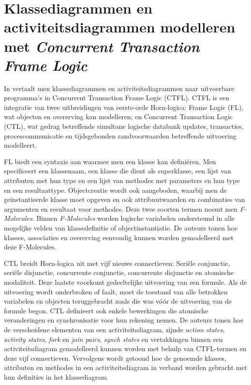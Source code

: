 \section{Klassediagrammen en activiteitsdiagrammen modelleren met \textit{Concurrent Transaction Frame Logic}}

In \cite{RamalhoFranklin2004CTFL} vertaalt men klassediagrammen en activiteitsdiagrammen\cite{RumbaughJames2005Tuml} naar uitvoerbare programma's in Concurrent Transaction Frame Logic\cite{kifer1995deductive,kifer1996concurrency} (CTFL). CTFL is een integratie van twee uitbreidingen van eerste-orde Horn-logica: Frame Logic (FL), wat objecten en overerving kan modelleren; en Concurrent Transaction Logic (CTL), wat gedrag betreffende simultane logische databank updates, transacties, procescommunicatie en tijdsgebonden randvoorwaarden betreffende uitvoering modelleert.

FL biedt een syntaxis aan waarmee men een klasse kan defini\"eren. Men specificeert een klassenaam, een klasse die dient als superklasse, een lijst van attributen met hun type en een lijst van methodes met parameters en hun type en een resultaattype. Objectcreatie wordt ook aangeboden, waarbij men de ge\"instantieerde klasse moet opgeven en ook attribuutwaarden en combinaties van argumenten en resultaat voor methodes. Deze twee soorten termen noemt men \textit{F-Molecules}. Binnen \textit{F-Molecules} worden logische variabelen ondersteund in alle mogelijke velden van klassedefinitie of objectinstantiatie. De auteurs tonen hoe klasses, associaties en overerving eenvoudig kunnen worden gemodelleerd met deze F-Molecules.

CTL breidt Horn-logica uit met vijf nieuwe connectieven: Seri\"ele conjunctie, seri\"ele disjunctie, concurrente conjunctie, concurrente disjunctie en atomische modaliteit. Deze laatste voorkomt gedeeltelijke uitvoering van een formule. Als de uitvoering wordt onderbroken of faalt, moet de toestand van alle betrokken variabelen en objecten teruggebracht zoals die was v\'o\'or de uitvoering van de formule begon. CTL definieert ook enkele bewerkingen die atomische veranderingen en synchronisatie voor hun rekening nemen. De auteurs tonen hoe de verscheidene elementen van een activiteitsdiagram, zijnde \textit{action states}, \textit{activity states}, \textit{fork} en \textit{join pairs}, \textit{synch states} en vertakkingen binnen een activiteitsdiagram gemodelleerd kunnen worden met behulp van CTFL-termen en deze vijf connectieven. Vervolgens wordt getoond hoe de genoemde klasses, attributen en methodes in een activiteitsdiagram in verband worden gebracht met hun definities in het klassediagram.

